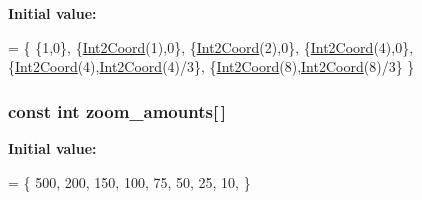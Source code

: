{\bfseries Initial value\-:}
\begin{DoxyCode}
=
\{
    \{1,0\},
    \{\hyperlink{a00204_a1bc12e8db97070dae0b6256347c8c2d6}{Int2Coord}(1),0\},
    \{\hyperlink{a00204_a1bc12e8db97070dae0b6256347c8c2d6}{Int2Coord}(2),0\},
    \{\hyperlink{a00204_a1bc12e8db97070dae0b6256347c8c2d6}{Int2Coord}(4),0\},
    \{\hyperlink{a00204_a1bc12e8db97070dae0b6256347c8c2d6}{Int2Coord}(4),\hyperlink{a00204_a1bc12e8db97070dae0b6256347c8c2d6}{Int2Coord}(4)/3\},
    \{\hyperlink{a00204_a1bc12e8db97070dae0b6256347c8c2d6}{Int2Coord}(8),\hyperlink{a00204_a1bc12e8db97070dae0b6256347c8c2d6}{Int2Coord}(8)/3\}
\}
\end{DoxyCode}
\hypertarget{a00230_a78b0dfa6de03f88325ba95ae25f33320}{
\subsubsection[{zoom\-\_\-amounts}]{\setlength{\rightskip}{0pt plus 5cm}const int zoom\-\_\-amounts\mbox{[}$\,$\mbox{]}}}\label{a00230_a78b0dfa6de03f88325ba95ae25f33320}
{\bfseries Initial value\-:}
\begin{DoxyCode}
=
\{
    500, 200, 150, 100, 75, 50, 25, 10,
\}
\end{DoxyCode}
